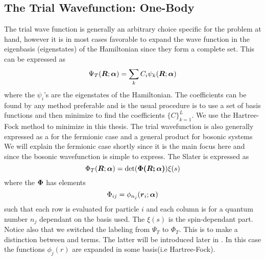     \subsection{The Trial Wavefunction: One-Body}
        The trial wave function is generally an arbitrary choice specific for
        the problem at hand, however it is in most cases favorable to expand
        the wave function in the eigenbasis (eigenstates) of the Hamiltonian
        since they form a complete set. This can be expressed as
            \begin{equation}
                {\Psi}_T(\boldsymbol{{R}};\boldsymbol{{\alpha}}) = \sum_k C_i\psi_k(\boldsymbol{{R}};\boldsymbol{{\alpha}})
            \end{equation}
        where the $\psi_i$'s are the eigenstates of the Hamiltonian. The
        coefficients can be found by any method preferable and is the usual
        procedure is to use a set of basis functions and then minimize to find
        the coefficients $\{C\}_{k=1}^L$. We use the Hartree-Fock method to
        minimize in this thesis. The trial wavefunction is also generally
        expressed as a  for the fermionic case and a
        general product for bosonic systems\cite{GriffQuan, NeOr, FeWa, DiVNe}
        We will explain the fermionic case shortly since it is the main focus
        here and since the bosonic wavefunction is simple to express. The
        Slater is expressed as
            \begin{equation}
                {\Phi}_T(\boldsymbol{{R}};\boldsymbol{{\alpha}}) = \det(\boldsymbol{{\Phi(\boldsymbol{{R}};\boldsymbol{{\alpha}})}}) \xi(s)
            \end{equation}
        where the  $\boldsymbol{{\Phi}}$ has elements
            \begin{equation}
                \Phi_{ij} = \phi_{n_j}(\boldsymbol{{r}}_i;\boldsymbol{{\alpha}})
            \end{equation}
        such that each row is evaluated for particle $i$ and each column is for
        a quantum number $n_j$ dependant on the basis used. The $\xi(s)$ is the
        spin-dependant part. Notice also that we switched the labeling from
        $\Psi_T$ to $\Phi_T$. This is to make a distinction between
         and  terms. The latter will be
        introduced later in . In this case the
         functions $\phi_j(r)$ are expanded in some
        basis(i.e Hartree-Fock).

